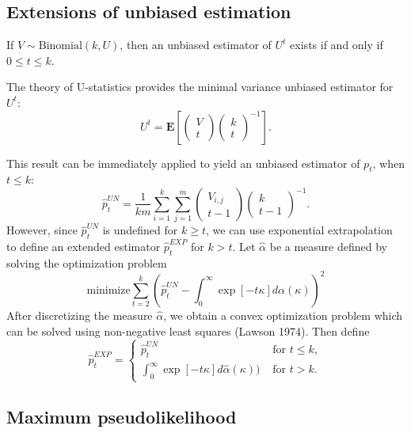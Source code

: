\documentclass{article}
\newcommand{\E}{\textbf{E}}
\begin{document}
\subsection{Extensions of unbiased estimation}

If $V \sim \text{Binomial}(k, U)$, then an unbiased estimator of $U^t$ exists
if and only if $0 \leq t \leq k$.

The theory of U-statistics provides the minimal variance unbiased estimator for $U^t$:
\[
U^t = \E\left[\begin{pmatrix}
V \\ t
\end{pmatrix}
\begin{pmatrix}
k \\ t
\end{pmatrix}^{-1}\right].
\]

This result can be immediately applied to yield an unbiased estimator of $p_t$, when $t \leq k$:
\begin{equation}\label{eq:ustat}
\hat{p}_t^{UN} =  \frac{1}{km}\sum_{i=1}^k\sum_{j=1}^{m} \begin{pmatrix}
V_{i, j} \\ t-1
\end{pmatrix}
\begin{pmatrix}
k \\ t-1
\end{pmatrix}^{-1}.
\end{equation}
However, since $\hat{p}_t^{UN}$ is undefined for $k \geq t$, we can use exponential extrapolation
to define an extended estimator $\hat{p}_t^{EXP}$ for $k > t$.
Let $\hat{\alpha}$ be a measure defined by solving the optimization problem
\[
\text{minimize} \sum_{t=2}^{k} \left(\hat{p}_t^{UN} - \int_0^\infty \exp[-t\kappa] d\alpha(\kappa)\right)^2
\]
After discretizing the measure $\hat{\alpha}$, we obtain a convex optimization problem
which can be solved using non-negative least squares (Lawson 1974).
Then define
\[
\hat{p}_t^{EXP} = \begin{cases}
\hat{p}_t^{UN}&\text{ for }t \leq k,\\
\int_0^\infty \exp[-t\kappa] d\hat{\alpha}(\kappa))&\text{ for }t > k.
\end{cases}
\]

\subsection{Maximum pseudolikelihood}
\end{document}
